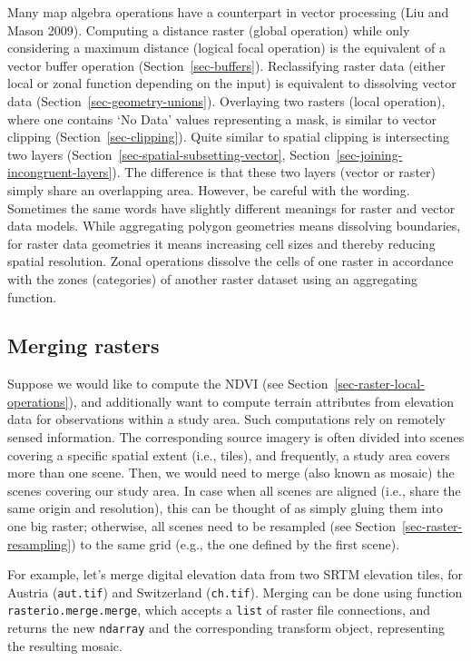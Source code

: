 \documentclass[
  letterpaper,
]{krantz}
\begin{document}
Many map algebra operations have a counterpart in vector processing (Liu
and Mason 2009). Computing a distance raster (global operation) while
only considering a maximum distance (logical focal operation) is the
equivalent of a vector buffer operation (Section~\ref{sec-buffers}).
Reclassifying raster data (either local or zonal function depending on
the input) is equivalent to dissolving vector data
(Section~\ref{sec-geometry-unions}). Overlaying two rasters (local
operation), where one contains `No Data' values representing a mask, is
similar to vector clipping (Section~\ref{sec-clipping}). Quite similar
to spatial clipping is intersecting two layers
(Section~\ref{sec-spatial-subsetting-vector},
Section~\ref{sec-joining-incongruent-layers}). The difference is that
these two layers (vector or raster) simply share an overlapping area.
However, be careful with the wording. Sometimes the same words have
slightly different meanings for raster and vector data models. While
aggregating polygon geometries means dissolving boundaries, for raster
data geometries it means increasing cell sizes and thereby reducing
spatial resolution. Zonal operations dissolve the cells of one raster in
accordance with the zones (categories) of another raster dataset using
an aggregating function.

\subsection{Merging rasters}\label{sec-merging-rasters}

Suppose we would like to compute the NDVI (see
Section~\ref{sec-raster-local-operations}), and additionally want to
compute terrain attributes from elevation data for observations within a
study area. Such computations rely on remotely sensed information. The
corresponding source imagery is often divided into scenes covering a
specific spatial extent (i.e., tiles), and frequently, a study area
covers more than one scene. Then, we would need to merge (also known as
mosaic) the scenes covering our study area. In case when all scenes are
aligned (i.e., share the same origin and resolution), this can be
thought of as simply gluing them into one big raster; otherwise, all
scenes need to be resampled (see Section~\ref{sec-raster-resampling}) to
the same grid (e.g., the one defined by the first scene).

For example, let's merge digital elevation data from two SRTM elevation
tiles, for Austria
(\texttt{\textquotesingle{}aut.tif\textquotesingle{}}) and Switzerland
(\texttt{\textquotesingle{}ch.tif\textquotesingle{}}). Merging can be
done using function \texttt{rasterio.merge.merge}, which accepts a
\texttt{list} of raster file connections, and returns the new
\texttt{ndarray} and the corresponding transform object, representing
the resulting mosaic.
\end{document}
